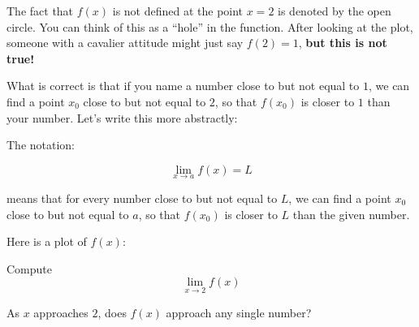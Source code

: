 \documentclass{ximera}
\begin{document}
The fact that $f(x)$ is not defined at the point $x=2$ is denoted by
the open circle. You can think of this as a ``hole'' in the
function. After looking at the plot, someone with a cavalier attitude
might just say $f(2) = 1$, \textbf{but this is not true!}

What is correct is that if you name a number close to but not equal to
$1$, we can find a point $x_0$ close to but not equal to $2$, so that
$f(x_0)$ is closer to $1$ than your number. Let's write this more
abstractly:

\begin{definition}
The notation:

\[
\lim_{x\to a} f(x) = L
\]

means that for every number close to but not equal to $L$, we can find
a point $x_0$ close to but not equal to $a$, so that $f(x_0)$ is
closer to $L$ than the given number.
\end{definition}




\begin{question}
Here is a plot of $f(x)$:
\begin{image}
\end{image}

Compute
\[
\lim_{x\to 2} f(x)
\]
\begin{hint}
As $x$ approaches $2$, does $f(x)$ approach any single number?
\end{hint}
\begin{multipleChoice}
\end{multipleChoice}  
\end{question}
\end{document}
